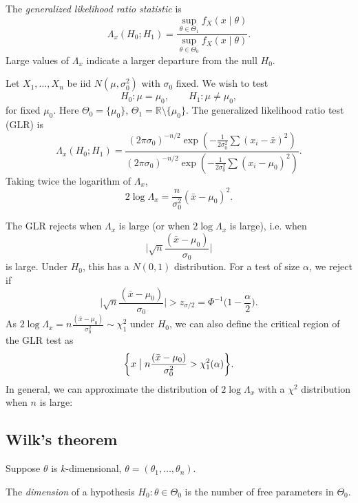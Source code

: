 \documentclass[12pt]{article}
\begin{document}
The \emph{generalized likelihood ratio statistic} is
\[
\Lambda_x(H_0;H_1) = \frac{\sup_{\theta \in \Theta_1}f_X(x \mid \theta)}{\sup_{\theta \in \Theta_0}f_X(x \mid \theta)}.
\]
Large values of $\Lambda_x$ indicate a larger departure from the null $H_0$.
\begin{exbox}
	Let $X_1, \ldots, X_n$ be iid $N(\mu, \sigma_0^2)$ with $\sigma_0$ fixed. We wish to test
	\[
	H_0 : \mu = \mu_0, \qquad H_1 : \mu \neq \mu_0,
	\]
	for fixed $\mu_0$. Here $\Theta_0 = \{\mu_0\}$, $\Theta_1 = \mathbb{R} \setminus \{\mu_0\}$. The generalized likelihood ratio test (GLR) is
	\[
		\Lambda_x(H_0;H_1) = \frac{(2 \pi\sigma_0)^{-n/2} \exp( -\frac{1}{2 \sigma_0^2} \sum (x_i - \bar x)^2)}{(2 \pi \sigma_0)^{-n/2}\exp(-\frac{1}{2\sigma_0^2}\sum(x_i - \mu_0)^2)}.
	\]
	Taking twice the logarithm of $\Lambda_x$,
	\[
	2 \log \Lambda_x = \frac{n}{\sigma_0^2}(\bar x - \mu_0)^2.
	\]
\end{exbox}

The GLR rejects when $\Lambda_x$ is large (or when $2 \log \Lambda_x$ is large), i.e. when
\[
\biggl| \sqrt n \frac{(\bar x - \mu_0)}{\sigma_0} \biggr|
\]
is large. Under $H_0$, this has a $N(0,1)$ distribution. For a test of size $\alpha$, we reject if
\[
\biggl| \sqrt n \frac{(\bar x - \mu_0)}{\sigma_0} \biggr| > z_{\sigma/2} = \Phi^{-1}\biggl(1 - \frac{\alpha}{2} \biggr).
\]
As $2 \log \Lambda_x = n \frac{(\bar x - \mu_0)}{\sigma_0^2} \sim \chi_1^2$ under $H_0$, we can also define the critical region of the GLR test as
\[
	\biggl\{ x \bigm| n \frac{(\bar x - \mu_0)}{\sigma_0^2} > \chi_1^2(\alpha) \biggr\}.
\]
In general, we can approximate the distribution of $2 \log \Lambda_x$ with a $\chi^2$ distribution when $n$ is large:

\subsection{Wilk's theorem}
\label{sub:wilks_theorem}

Suppose $\theta$ is $k$-dimensional, $\theta = (\theta_1, \ldots, \theta_n)$.

The \emph{dimension} of a hypothesis $H_0 : \theta \in \Theta_0$ is the number of free parameters in $\Theta_0$.
\end{document}
